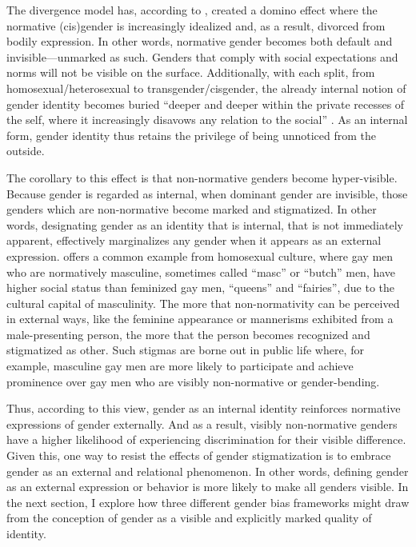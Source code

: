 \documentclass[anonymous,review]{acmart}
\begin{document}
The divergence model has, according to \citet{amin:2022}, created a domino effect where the normative (cis)gender is increasingly idealized and, as a result, divorced from bodily expression. In other words, normative gender becomes both default and invisible—unmarked as such. Genders that comply with social expectations and norms will not be visible on the surface. Additionally, with each split, from homosexual/heterosexual to transgender/cisgender, the already internal notion of gender identity becomes buried “deeper and deeper within the private recesses of the self, where it increasingly disavows any relation to the social” \citep{amin:2022}. As an internal form, gender identity thus retains the privilege of being unnoticed from the outside.      

The corollary to this effect is that non-normative genders become hyper-visible. Because gender is regarded as internal, when dominant gender are invisible, those genders which are non-normative become marked and stigmatized. In other words, designating gender as an identity that is internal, that is not immediately apparent, effectively marginalizes any gender when it appears as an external expression. \citet{amin:2022} offers a common example from homosexual culture, where gay men who are normatively masculine, sometimes called “masc” or “butch” men, have higher social status than feminized gay men, “queens” and “fairies”, due to the cultural capital of masculinity. The more that non-normativity can be perceived in external ways, like the feminine appearance or mannerisms exhibited from a male-presenting person, the more that the person becomes recognized and stigmatized as other. Such stigmas are borne out in public life where, for example, masculine gay men are more likely to participate and achieve prominence over gay men who are visibly non-normative or gender-bending.

Thus, according to this view, gender as an internal identity reinforces normative expressions of gender externally. And as a result, visibly non-normative genders have a higher likelihood of experiencing discrimination for their visible difference. Given this, one way to resist the effects of gender stigmatization is to embrace gender as an external and relational phenomenon. In other words, defining gender as an external expression or behavior is more likely to make all genders visible. In the next section, I explore how three different gender bias frameworks might draw from the conception of gender as a visible and explicitly marked quality of identity.
\end{document}
